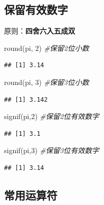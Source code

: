 \documentclass[
]{book}
\newenvironment{Shaded}{\begin{snugshade}}{\end{snugshade}}
\newcommand{\CommentTok}[1]{\textcolor[rgb]{0.56,0.35,0.01}{\textit{#1}}}
\newcommand{\DecValTok}[1]{\textcolor[rgb]{0.00,0.00,0.81}{#1}}
\newcommand{\FunctionTok}[1]{\textcolor[rgb]{0.00,0.00,0.00}{#1}}
\newcommand{\NormalTok}[1]{#1}
\begin{document}
\hypertarget{ux4fddux7559ux6709ux6548ux6570ux5b57}{%
\subsection{保留有效数字}\label{ux4fddux7559ux6709ux6548ux6570ux5b57}}

原则：\textbf{四舍六入五成双}

\begin{Shaded}
\begin{Highlighting}[]
\FunctionTok{round}\NormalTok{(pi, }\DecValTok{2}\NormalTok{) }\CommentTok{\#保留2位小数}
\end{Highlighting}
\end{Shaded}

\begin{verbatim}
## [1] 3.14
\end{verbatim}

\begin{Shaded}
\begin{Highlighting}[]
\FunctionTok{round}\NormalTok{(pi, }\DecValTok{3}\NormalTok{) }\CommentTok{\#保留3位小数}
\end{Highlighting}
\end{Shaded}

\begin{verbatim}
## [1] 3.142
\end{verbatim}

\begin{Shaded}
\begin{Highlighting}[]
\FunctionTok{signif}\NormalTok{(pi,}\DecValTok{2}\NormalTok{) }\CommentTok{\#保留2位有效数字}
\end{Highlighting}
\end{Shaded}

\begin{verbatim}
## [1] 3.1
\end{verbatim}

\begin{Shaded}
\begin{Highlighting}[]
\FunctionTok{signif}\NormalTok{(pi,}\DecValTok{3}\NormalTok{) }\CommentTok{\#保留3位有效数字}
\end{Highlighting}
\end{Shaded}

\begin{verbatim}
## [1] 3.14
\end{verbatim}

\hypertarget{ux5e38ux7528ux8fd0ux7b97ux7b26}{%
\subsection{常用运算符}\label{ux5e38ux7528ux8fd0ux7b97ux7b26}}
\end{document}
